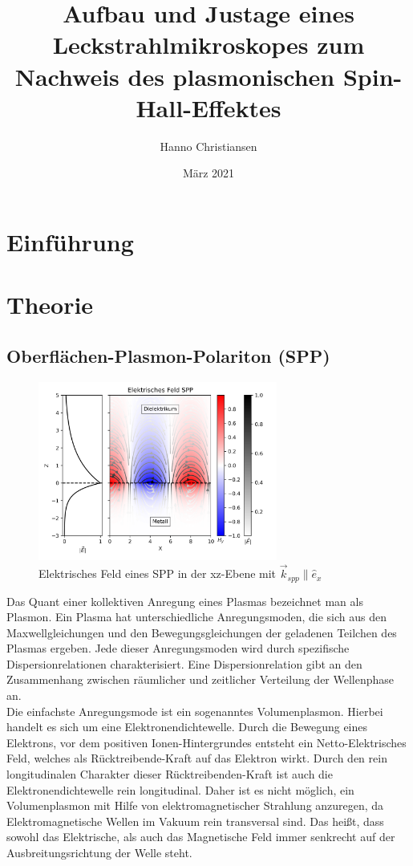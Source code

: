 \documentclass{article}
\title{Aufbau und Justage eines Leckstrahlmikroskopes zum Nachweis des plasmonischen Spin-Hall-Effektes}
\author{Hanno Christiansen}
\date{März 2021}
\begin{document}
	
\maketitle
\tableofcontents

\section{Einführung}
\section{Theorie}
	\subsection{Oberflächen-Plasmon-Polariton (SPP)}
	\begin{figure}[htbp] 
		\centering
		\includegraphics[width=0.7\textwidth]{figures/E_Feld_SPP.png}
		\caption{Elektrisches Feld eines SPP in der xz-Ebene mit $\vec{k}_{spp} \parallel \hat{e}_x$}
		\label{fig:electric_field_spp}
	\end{figure}
	Das Quant einer kollektiven Anregung eines Plasmas bezeichnet man als Plasmon. Ein Plasma hat unterschiedliche Anregungsmoden, die sich aus den Maxwellgleichungen und den Bewegungsgleichungen der geladenen Teilchen des Plasmas ergeben. Jede dieser Anregungsmoden wird durch spezifische Dispersionrelationen charakterisiert. Eine Dispersionrelation gibt an den Zusammenhang zwischen räumlicher und zeitlicher Verteilung der Wellenphase an.\cite{Fox.2020}\\
	
	Die einfachste Anregungsmode ist ein sogenanntes Volumenplasmon. Hierbei handelt es sich um eine Elektronendichtewelle. Durch die Bewegung eines Elektrons, vor dem positiven Ionen-Hintergrundes entsteht ein Netto-Elektrisches Feld, welches als Rücktreibende-Kraft auf das Elektron wirkt. Durch den rein longitudinalen Charakter dieser Rücktreibenden-Kraft ist auch die Elektronendichtewelle rein longitudinal. Daher ist es nicht möglich, ein Volumenplasmon mit Hilfe von elektromagnetischer Strahlung anzuregen, da Elektromagnetische Wellen im Vakuum rein transversal sind. Das heißt, dass sowohl das Elektrische, als auch das Magnetische Feld immer senkrecht auf der Ausbreitungsrichtung der Welle steht.\\
	
\end{document}
